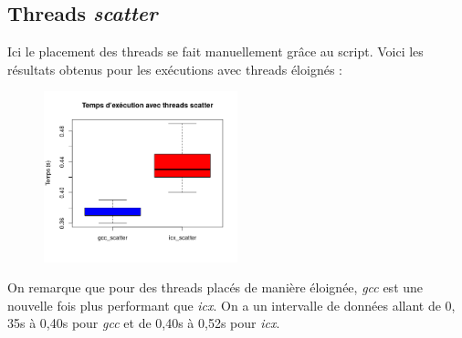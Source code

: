 \documentclass{rapport}
\begin{document}
        \subsection{Threads \textit{scatter}}
        Ici le placement des threads se fait manuellement grâce au script.
        \newline
        Voici les résultats obtenus pour les exécutions avec threads éloignés :

        \begin{figure}[H]
            \centering
            \includegraphics[width=0.5\textwidth]{../benhmark/scatter.png}
        \end{figure}

        On remarque que pour des threads placés de manière éloignée, \textit{gcc} est une nouvelle fois plus performant que \textit{icx}. On a un intervalle de données allant de 0, 35s à 0,40s pour \textit{gcc} et de 0,40s à 0,52s pour \textit{icx}.
    \clearpage
\end{document}
